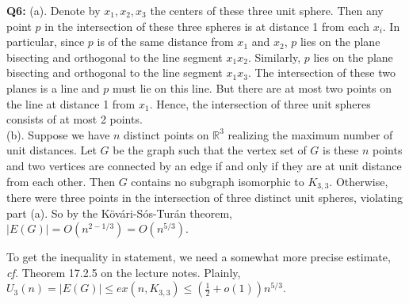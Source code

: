 \documentclass[12pt,reqno]{amsart}
\theoremstyle{definition}
\newcommand{\RR}{\mathbb{R}}
\begin{document}
\newpage
\noindent \textbf{Q6:} (a). Denote by $x_1,x_2,x_3$ the centers of these three unit sphere. Then any point $p$ in the intersection of these three spheres is at distance 1 from each $x_i$. In particular, since $p$ is of the same distance from $x_1$ and $x_2$, $p$ lies on the plane bisecting and orthogonal to the line segment $x_1x_2$. Similarly, $p$ lies on the plane bisecting and orthogonal to the line segment $x_1x_3$. The intersection of these two planes is a line and $p$ must lie on this line. But there are at most two points on the line at distance 1 from $x_1$. Hence, the intersection of three unit spheres consists of at most 2 points.\\


(b). Suppose we have $n$ distinct points on $\RR^3$ realizing the maximum number of unit distances. Let $G$ be the graph such that the vertex set of $G$ is these $n$ points and two vertices are connected by an edge if and only if they are at unit distance from each other. Then $G$ contains no subgraph isomorphic to $K_{3,3}$. Otherwise, there were three points in the intersection of three distinct unit spheres, violating part (a). So by the K{\"o}v{\'a}ri-S{\'o}s-Tur{\'a}n theorem, $|E(G)| = O(n^{2-1/3}) = O(n^{5/3})$.

To get the inequality in statement, we need a somewhat more precise estimate, \emph{cf.} Theorem 17.2.5 on the lecture notes. Plainly, $U_3(n) = |E(G)|\leq ex(n,K_{3,3}) \leq (\frac{1}{2}+o(1)) n^{5/3}$.
\end{document}
